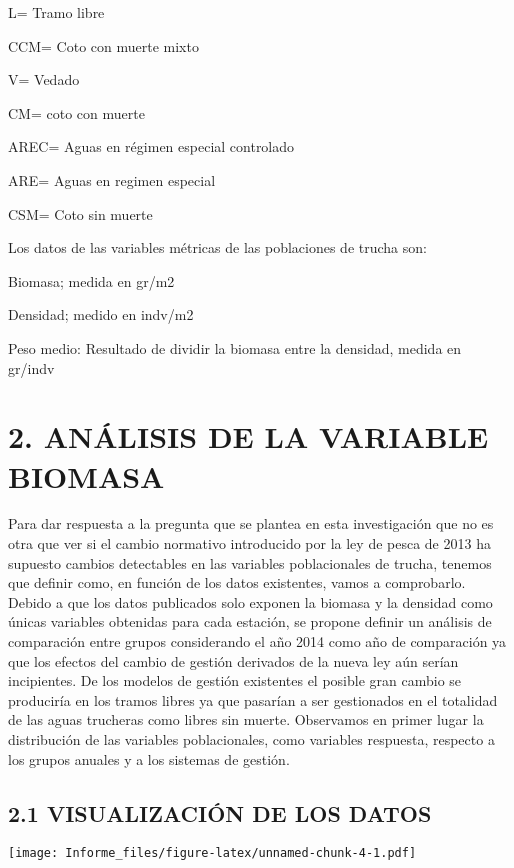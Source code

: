 \documentclass[
]{article}
\begin{document}
L= Tramo libre

CCM= Coto con muerte mixto

V= Vedado

CM= coto con muerte

AREC= Aguas en régimen especial controlado

ARE= Aguas en regimen especial

CSM= Coto sin muerte

Los datos de las variables métricas de las poblaciones de trucha son:

Biomasa; medida en gr/m2

Densidad; medido en indv/m2

Peso medio: Resultado de dividir la biomasa entre la densidad, medida en
gr/indv

\hypertarget{anuxe1lisis-de-la-variable-biomasa}{%
\section{2. ANÁLISIS DE LA VARIABLE
BIOMASA}\label{anuxe1lisis-de-la-variable-biomasa}}

Para dar respuesta a la pregunta que se plantea en esta investigación
que no es otra que ver si el cambio normativo introducido por la ley de
pesca de 2013 ha supuesto cambios detectables en las variables
poblacionales de trucha, tenemos que definir como, en función de los
datos existentes, vamos a comprobarlo. Debido a que los datos publicados
solo exponen la biomasa y la densidad como únicas variables obtenidas
para cada estación, se propone definir un análisis de comparación entre
grupos considerando el año 2014 como año de comparación ya que los
efectos del cambio de gestión derivados de la nueva ley aún serían
incipientes. De los modelos de gestión existentes el posible gran cambio
se produciría en los tramos libres ya que pasarían a ser gestionados en
el totalidad de las aguas trucheras como libres sin muerte. Observamos
en primer lugar la distribución de las variables poblacionales, como
variables respuesta, respecto a los grupos anuales y a los sistemas de
gestión.

\hypertarget{visualizaciuxf3n-de-los-datos}{%
\subsection{2.1 VISUALIZACIÓN DE LOS
DATOS}\label{visualizaciuxf3n-de-los-datos}}

\texttt{[image: Informe\_files/figure-latex/unnamed-chunk-4-1.pdf]}
\end{document}
